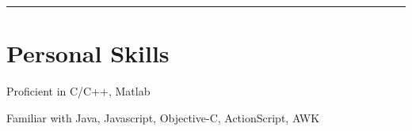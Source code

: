 \documentclass[letterpaper]{article}
\renewenvironment{itemize}{
  \begin{list}{}{
    \setlength{\leftmargin}{1.5em}
    \setlength{\itemsep}{0pt}
  }
}{
  \end{list}
}
\begin{document}
\rule{16.8cm}{0.1em}

\vspace{-1.5em}
\section*{Personal Skills}
\begin{itemize}
\item Proficient in C/C++, Matlab
\item Familiar with Java, Javascript, Objective-C, ActionScript, AWK
%
%
\end{itemize}
\end{document}
